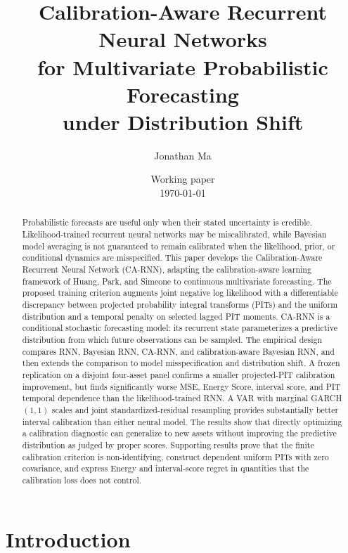 \documentclass[11pt]{article}
\title{Calibration-Aware Recurrent Neural Networks\\
for Multivariate Probabilistic Forecasting\\
under Distribution Shift}
\author{Jonathan Ma}
\date{Working paper\\\today}
\begin{document}
\hypersetup{pageanchor=false}
\maketitle

\begin{abstract}
Probabilistic forecasts are useful only when their stated uncertainty is credible.
Likelihood-trained recurrent neural networks may be miscalibrated, while Bayesian
model averaging is not guaranteed to remain calibrated when the likelihood, prior,
or conditional dynamics are misspecified. This paper develops the
Calibration-Aware Recurrent Neural Network (CA-RNN), adapting the
calibration-aware learning framework of Huang, Park, and
Simeone to continuous multivariate forecasting. The proposed training criterion
augments joint negative log likelihood with a differentiable discrepancy between
projected probability integral transforms (PITs) and the uniform distribution
and a temporal penalty on selected lagged PIT moments. CA-RNN is a conditional
stochastic forecasting model: its recurrent
state parameterizes a predictive distribution from which future observations can
be sampled. The empirical design compares RNN, Bayesian RNN, CA-RNN, and
calibration-aware Bayesian RNN, and then extends the comparison to model
misspecification and distribution shift. A frozen replication on a disjoint
four-asset panel confirms a smaller projected-PIT calibration improvement, but
finds significantly worse MSE, Energy Score, interval score, and PIT temporal
dependence than the likelihood-trained RNN. A VAR with marginal GARCH$(1,1)$
scales and joint standardized-residual resampling provides substantially better
interval calibration than either neural model. The results show that directly
optimizing a calibration diagnostic can generalize to new assets without
improving the predictive distribution as judged by proper scores. Supporting
results prove that the finite calibration criterion is non-identifying, construct
dependent uniform PITs with zero covariance, and express Energy and interval-score
regret in quantities that the calibration loss does not control.
\end{abstract}

\newpage
\tableofcontents
\clearpage
\hypersetup{pageanchor=true}

\section{Introduction}
\end{document}
